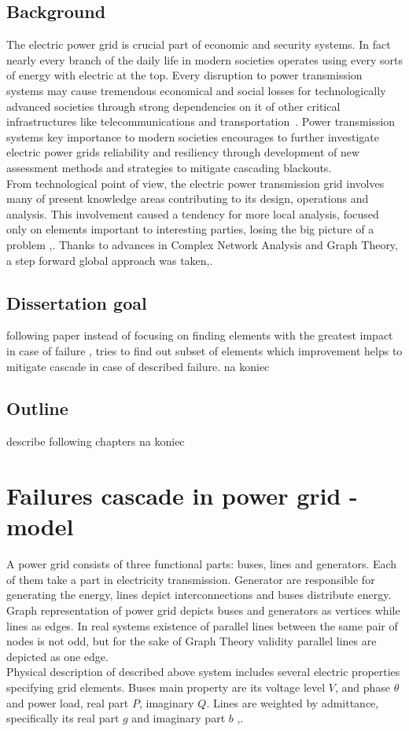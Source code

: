 \documentclass[twoside]{iisthesis}
\begin{document}
\section{Background}
The electric power grid is crucial part of economic and security systems. In fact nearly every branch of the daily life in modern societies operates using every sorts of energy with electric at the top. Every disruption to power transmission systems may cause tremendous economical and social losses for technologically advanced societies through strong dependencies on it of other critical infrastructures like telecommunications and transportation~\cite{vanEaten10}. 
Power transmission systems key importance to modern societies encourages to further investigate electric power grids reliability and  resiliency through development of new assessment methods and strategies to mitigate cascading blackouts.
\\
From technological point of view, the electric power transmission grid involves many of present knowledge areas contributing to its design, operations and analysis. This involvement caused a tendency for more local analysis, focused only on elements important to interesting parties, losing the big picture of a problem \cite{carreras2001},\cite{Hiskens1997}. Thanks to advances in Complex Network Analysis and Graph Theory\cite{Watts1998},\cite{Barabasi1997} a step forward global approach was taken\cite{Koc2014},\cite{Asztalos2014}.

\section{Dissertation goal}

following paper instead of focusing on finding elements with the greatest impact in case of failure , tries to find out subset of elements which improvement helps to mitigate cascade in case of described failure. 
na koniec
\section{Outline}   

describe following chapters
na koniec
\chapter{Failures cascade in power grid - model}

A power grid consists of three functional parts: buses, lines and generators. Each of them take a part in electricity transmission. Generator are responsible for generating the energy, lines depict interconnections and buses distribute energy. Graph representation of power grid depicts buses and generators as vertices while lines as edges. In real systems existence of parallel lines between the same pair of nodes is not odd, but for the sake of Graph Theory validity parallel lines are depicted as one edge.  
\\
Physical description of described above system includes several electric properties specifying grid elements. Buses main property are its voltage level  \(V\), and phase \(\theta\) and power load, real part \(P\), imaginary \(Q\). Lines are weighted by admittance, specifically its real part \(g\) and imaginary part \(b\) \cite{VanHertem2006},\cite{Graigner1994}.
\end{document}
